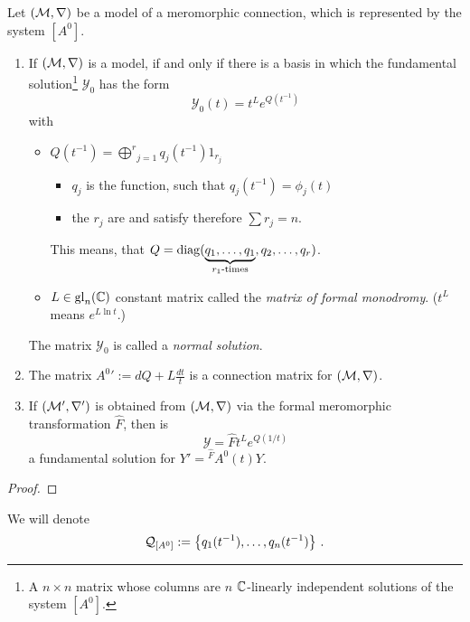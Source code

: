 \begin{lem}
  Let $(\mathcal{M},\nabla)$ be a model of a meromorphic connection, which is
  represented by the system $[A^0]$.
  \begin{enumerate}
    \item 
      If $(\mathcal{M},\nabla)$ is a model, if and only if there is a basis in which
      the fundamental solution\footnote{A $n\times n$ matrix whose
      columns are $n$ $\mathbb{C}$-linearly independent solutions of the system
      $[A^0]$.} $\mathcal{Y}_0$ has the form
      \[
        \mathcal{Y}_0(t)=t^L e^{Q(t^{-1})}
      \]
      with
      \begin{itemize}
        \item
          $Q(t^{-1})=\underset{j=1}{\overset{r}{\bigoplus}}q_j(t^{-1})1_{r_j}$
          \begin{itemize}
            \item $q_j$ is the function, such that $q_j(t^{-1})=\phi_j(t)$
            \item the $r_j$ are \TODO{} and satisfy therefore $\sum r_j=n$.
          \end{itemize}
          This means, that $Q=\diag(\underset{r_1\text{-times}}{\underbrace{%
            q_1,\dots,q_1}},q_2,\dots,q_r)$.
        \item $L\in\operatorname{gl}_n(\mathbb{C})$ constant matrix called the \emph{matrix of
          formal monodromy}. ($t^L$ means $e^{L\ln t}$.)
      \end{itemize}
      The matrix $\mathcal{Y}_0$ is called a \emph{normal solution}.
    \item The matrix ${A^0}':=dQ+L\frac{dt}{t}$ is a connection matrix for
      $(\mathcal{M},\nabla)$.
    \item If $(\mathcal{M}',\nabla')$ is obtained from $(\mathcal{M},\nabla)$ via the formal
      meromorphic transformation $\hat F$, then is
      \[
        \mathcal{Y}=\hat F t^L e^{Q(1/t)}
      \]
      a fundamental solution for $Y'={}^{\hat F}\!A^0(t)Y$.
  \end{enumerate}
\end{lem}
\begin{proof}
  \TODO{}
\end{proof}
We will denote
\[
  \mathcal{Q}_{[A^0]}:=\left\{q_1(t^{-1}),\dots,q_n(t^{-1})\right\} \,.
\]

